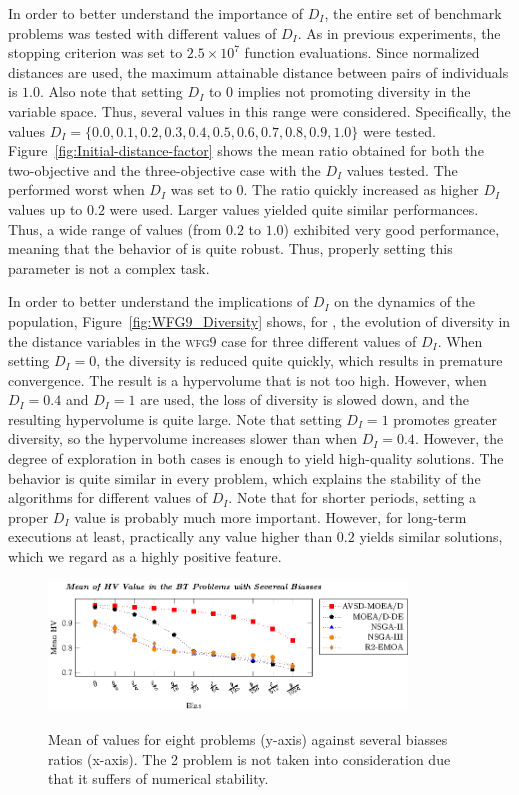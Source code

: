 In order to better understand the importance of $D_I$, the entire set of benchmark problems was tested with different values
of $D_I$.
%
As in previous experiments, the stopping criterion was set to $2.5 \times 10^7$ function evaluations.
%
Since normalized distances are used, the maximum attainable distance between pairs of individuals is $1.0$.
%
Also note that setting $D_I$ to $0$ implies not promoting diversity in the variable space.
%
Thus, several values in this range were considered.
%
Specifically, the values $D_I = \{0.0, 0.1, 0.2, 0.3, 0.4, 0.5, 0.6, 0.7, 0.8, 0.9, 1.0\}$ were tested.
%
Figure~\ref{fig:Initial-distance-factor} shows the mean \HV{} ratio obtained for both the two-objective 
and the three-objective case with the $D_I$ values tested.
%
The \AVSDMOEAD{} performed worst when $D_I$ was set to $0$.
%
The \HV{} ratio quickly increased as higher $D_I$ values up to $0.2$ were used.
%
Larger values yielded quite similar performances.
%
Thus, a wide range of values (from $0.2$ to $1.0$) exhibited very good performance, 
meaning that the behavior of \AVSDMOEAD{} is quite robust.
%
Thus, properly setting this parameter is not a complex task.

In order to better understand the implications of $D_I$ on the dynamics of the population, Figure~\ref{fig:WFG9_Diversity}
shows, for \AVSDMOEAD{}, the evolution of diversity in the distance variables in the \textsc{wfg9} case for three different values of $D_I$.
%
When setting $D_I = 0$, the diversity is reduced quite quickly, which results in premature convergence.
%
The result is a hypervolume that is not too high.
%
However, when $D_I = 0.4$ and $D_I = 1$ are used, the loss of diversity is slowed down, and the resulting hypervolume is quite large.
%
Note that setting $D_I = 1$ promotes greater diversity, so the hypervolume increases slower than when
$D_I = 0.4$.
%
However, the degree of exploration in both cases is enough to yield high-quality solutions.
%
The behavior is quite similar in every problem, which explains the stability of the algorithms for
different values of $D_I$.
%
Note that for shorter periods, setting a proper $D_I$ value is probably much more important.
%
However, for long-term executions at least, practically any value higher than $0.2$ yields similar solutions,
which we regard as a highly positive feature.
\begin{figure}[t]
\centering
\includegraphics[width=0.85\textwidth]{images/BIAS-figure0.eps} \\
\caption{Mean of \HV{} values for eight \BTS{} problems (y-axis) against several biasses ratios (x-axis). The \BT{}2 problem is not taken into consideration due that it suffers of numerical stability.}\label{fig:BT}
\end{figure}

